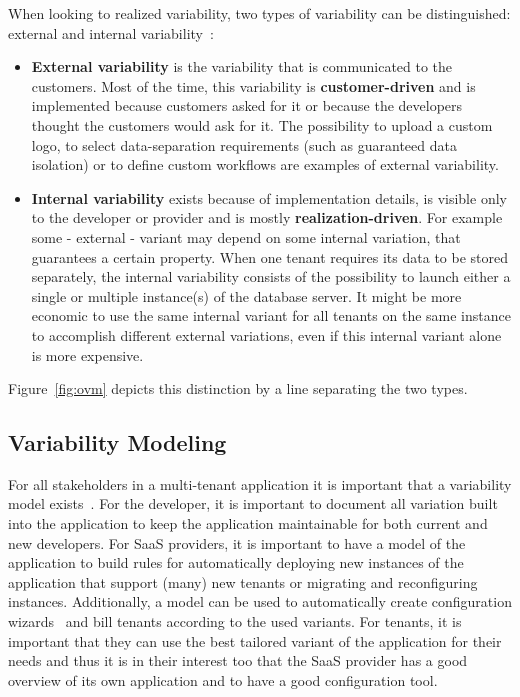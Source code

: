 When looking to realized variability, two types of variability can be distinguished: external and internal variability~\cite{mietzner2009variability}:
\begin{itemize}
\item \textbf{External variability} is the variability that is communicated to the customers. Most of the time, this variability is \textbf{customer-driven} and is implemented because customers asked for it or because the developers thought the customers would ask for it. The possibility to upload a custom logo, to select data-separation requirements (such as guaranteed data isolation) or to define custom workflows are examples of external variability.
\item \textbf{Internal variability} exists because of implementation details, is visible only to the developer or provider and is mostly \textbf{realization-driven}. For example some - external - variant may depend on some internal variation, that guarantees a certain property. When one tenant requires its data to be stored separately, the internal variability consists of the possibility to launch either a single or multiple instance(s) of the database server. It might be more economic to use the same internal variant for all tenants on the same instance to accomplish different external variations, even if this internal variant alone is more expensive.
\end{itemize}
Figure~\ref{fig:ovm} depicts this distinction by a line separating the two types.

\subsection{Variability Modeling}
For all stakeholders in a multi-tenant application it is important that a variability model exists~\cite{schroeter2012towards}. For the developer, it is important to document all variation built into the application to keep the application maintainable for both current and new developers. 
For SaaS providers, it is important to have a model of the application to build rules for automatically deploying new instances of the application that support (many) new tenants or migrating and reconfiguring instances. 
Additionally, a model can be used to automatically create configuration wizards~\cite{mietzner2008generation} and bill tenants according to the used variants.
For tenants, it is important that they can use the best tailored variant of the application for their needs and thus it is in their interest too that the SaaS provider has a good overview of its own application and to have a good configuration tool.

